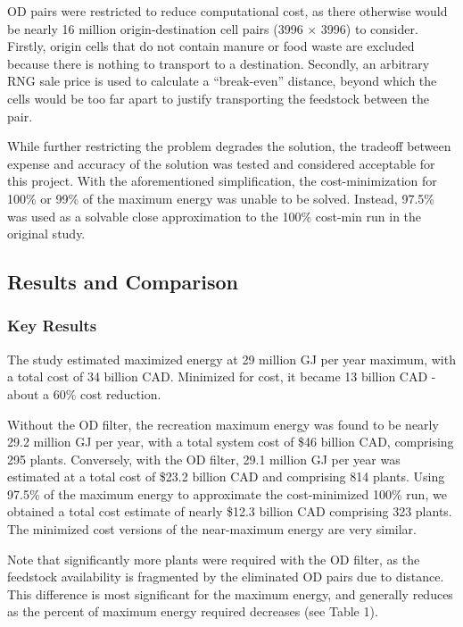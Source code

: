 \documentclass[12pt]{article}
\begin{document}
OD pairs were restricted to reduce computational cost, as there otherwise would be nearly 16 million origin-destination cell pairs (3996 $\times$ 3996) to consider. Firstly, origin cells that do not contain manure or food waste are excluded because there is nothing to transport to a destination. Secondly, an arbitrary RNG sale price is used to calculate a “break-even” distance, beyond which the cells would be too far apart to justify transporting the feedstock between the pair. 

While further restricting the problem degrades the solution, the tradeoff between expense and accuracy of the solution was tested and considered acceptable for this project. With the aforementioned simplification, the cost-minimization for 100\% or 99\% of the maximum energy was unable to be solved. Instead, 97.5\% was used as a solvable close approximation to the 100\% cost-min run in the original study. 


\subsection{Results and Comparison}

\subsubsection{Key Results}
The study estimated maximized energy at 29 million GJ per year maximum, with a total cost of 34 billion CAD. Minimized for cost, it became 13 billion CAD - about a 60\% cost reduction. 

Without the OD filter, the recreation maximum energy was found to be nearly 29.2 million GJ per year, with a total system cost of \$46 billion CAD, comprising 295 plants. Conversely, with the OD filter, 29.1 million GJ per year was estimated at a total cost of \$23.2 billion CAD and comprising 814 plants. Using 97.5\% of the maximum energy to approximate the cost-minimized 100\% run, we obtained a total cost estimate of nearly \$12.3 billion CAD comprising 323 plants. The minimized cost versions of the near-maximum energy are very similar.

Note that significantly more plants were required with the OD filter, as the feedstock availability is fragmented by the eliminated OD pairs due to distance. This difference is most significant for the maximum energy, and generally reduces as the percent of maximum energy required decreases (see Table 1).
\end{document}
